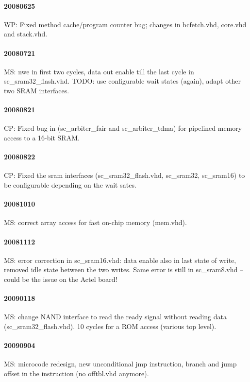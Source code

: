 \documentclass[a4paper,12pt]{scrartcl}
\newcommand{\code}[1]{{\textsf{#1}}}
\begin{document}
\paragraph{20080625} WP: Fixed method cache/program counter bug; changes in
\code{bcfetch.vhd}, \code{core.vhd} and \code{stack.vhd}.

\paragraph{20080721} MS: \code{nwe} in first two cycles, data out
enable till the last cycle in \code{sc\_sram32\_flash.vhd}. TODO: use
configurable wait states (again), adapt other two SRAM interfaces.

\paragraph{20080821} CP: Fixed bug in (\code{sc\_arbiter\_fair} and
\code{sc\_arbiter\_tdma}) for pipelined memory access to a 16-bit
SRAM.

\paragraph{20080822} CP: Fixed the sram interfaces (\code{sc\_sram32\_flash.vhd},
\code{sc\_sram32}, \code{sc\_sram16}) to be configurable depending on
the wait sates.

\paragraph{20081010} MS: correct array access for fast on-chip memory
(\code{mem\sc.vhd}).

\paragraph{20081112} MS: error correction in \code{sc\_sram16.vhd}: data enable also in last
state of write, removed idle state between the two writes. Same error
is still in \code{sc\_sram8.vhd} -- could be the issue on the Actel
board!

\paragraph{20090118} MS: change NAND interface to read the ready
signal without reading data (\code{sc\_sram32\_flash.vhd}). 10 cycles
for a ROM access (various top level).

\paragraph{20090904} MS: microcode redesign, new unconditional jmp
instruction, branch and jump offset in the instruction (no offtbl.vhd
anymore).
\end{document}
